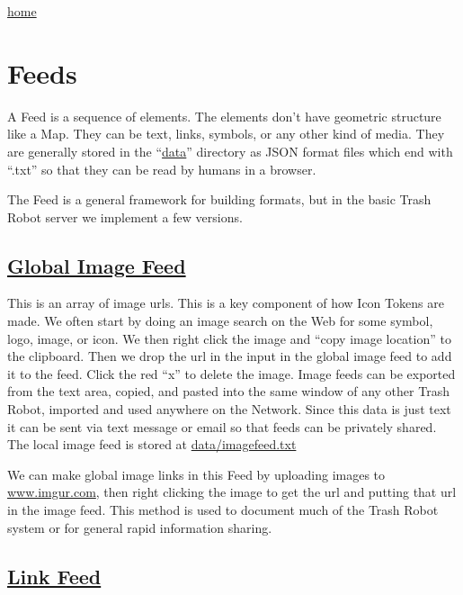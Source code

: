 \href{index.html}{home}

\section{Feeds}\label{feeds}

A Feed is a sequence of elements. The elements don't have geometric
structure like a Map. They can be text, links, symbols, or any other
kind of media. They are generally stored in the ``\href{data/}{data}''
directory as JSON format files which end with ``.txt'' so that they can
be read by humans in a browser.

The Feed is a general framework for building formats, but in the basic
Trash Robot server we implement a few versions.

\subsection{\texorpdfstring{\href{globalimagefeed.html}{Global Image
Feed}}{Global Image Feed}}\label{global-image-feed}

This is an array of image urls. This is a key component of how Icon
Tokens are made. We often start by doing an image search on the Web for
some symbol, logo, image, or icon. We then right click the image and
``copy image location'' to the clipboard. Then we drop the url in the
input in the global image feed to add it to the feed. Click the red
``x'' to delete the image. Image feeds can be exported from the text
area, copied, and pasted into the same window of any other Trash Robot,
imported and used anywhere on the Network. Since this data is just text
it can be sent via text message or email so that feeds can be privately
shared. The local image feed is stored at \url{data/imagefeed.txt}

We can make global image links in this Feed by uploading images to
\href{https://imgur.com/}{www.imgur.com}, then right clicking the image
to get the url and putting that url in the image feed. This method is
used to document much of the Trash Robot system or for general rapid
information sharing.

\subsection{\texorpdfstring{\href{linkfeed.html}{Link
Feed}}{Link Feed}}\label{link-feed}

